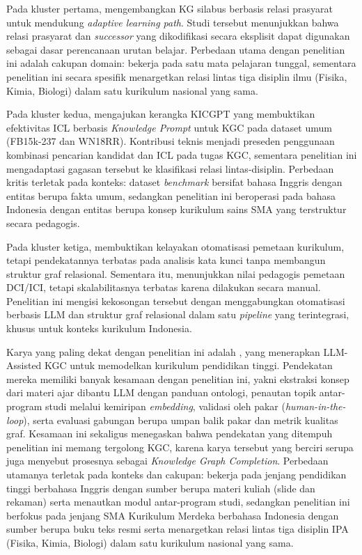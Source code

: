 \documentclass[../../thesis]{subfiles}
\begin{document}
Pada kluster pertama, \textcite{zhang_learning_2023} mengembangkan KG silabus
berbasis relasi prasyarat untuk mendukung \textit{adaptive learning
path}. Studi tersebut menunjukkan bahwa relasi prasyarat dan \textit{successor}
yang dikodifikasi secara eksplisit dapat digunakan sebagai dasar
perencanaan urutan belajar. Perbedaan utama dengan penelitian
ini adalah cakupan domain: \citeauthor{zhang_learning_2023} bekerja pada satu mata pelajaran
tunggal, sementara penelitian ini secara spesifik menargetkan relasi
lintas tiga disiplin ilmu (Fisika, Kimia, Biologi) dalam satu kurikulum
nasional yang sama.

Pada kluster kedua, \textcite{wei_kicgpt_2023} mengajukan kerangka KICGPT yang
membuktikan efektivitas ICL berbasis \textit{Knowledge Prompt} untuk KGC pada
dataset umum (FB15k-237 dan WN18RR). Kontribusi teknis \citeauthor{wei_kicgpt_2023}
menjadi preseden penggunaan kombinasi pencarian kandidat dan ICL pada tugas KGC,
sementara penelitian ini mengadaptasi gagasan tersebut ke klasifikasi relasi
lintas-disiplin. Perbedaan kritis terletak pada konteks: dataset
\textit{benchmark} \citeauthor{wei_kicgpt_2023} bersifat bahasa Inggris dengan entitas
berupa fakta umum, sedangkan penelitian ini beroperasi pada bahasa
Indonesia dengan entitas berupa konsep kurikulum sains SMA yang
terstruktur secara pedagogis.

Pada kluster ketiga, \textcite{said_mapping_2024} membuktikan kelayakan
otomatisasi pemetaan kurikulum, tetapi pendekatannya terbatas pada analisis
kata kunci tanpa membangun struktur graf relasional. Sementara itu,
\textcite{semilarski_expanding_2022} menunjukkan nilai pedagogis pemetaan
DCI/ICI, tetapi skalabilitasnya terbatas karena dilakukan secara manual.
Penelitian ini mengisi kekosongan tersebut dengan menggabungkan otomatisasi
berbasis LLM dan struktur graf relasional dalam satu \textit{pipeline} yang
terintegrasi, khusus untuk konteks kurikulum Indonesia.

Karya yang paling dekat dengan penelitian ini adalah
\textcite{abu-rasheed_llm-assisted_2025}, yang menerapkan LLM-Assisted KGC untuk
memodelkan kurikulum pendidikan tinggi. Pendekatan mereka memiliki banyak
kesamaan dengan penelitian ini, yakni ekstraksi konsep dari materi ajar dibantu
LLM dengan panduan ontologi, penautan topik antar-program studi melalui
kemiripan \textit{embedding}, validasi oleh pakar (\textit{human-in-the-loop}),
serta evaluasi gabungan berupa umpan balik pakar dan metrik kualitas graf.
Kesamaan ini sekaligus menegaskan bahwa pendekatan yang ditempuh penelitian ini
memang tergolong KGC, karena karya tersebut yang berciri serupa juga menyebut
prosesnya sebagai \textit{Knowledge Graph Completion}. Perbedaan utamanya
terletak pada konteks dan cakupan: \citeauthor{abu-rasheed_llm-assisted_2025}
bekerja pada jenjang pendidikan tinggi berbahasa Inggris dengan sumber berupa
materi kuliah (slide dan rekaman) serta menautkan modul antar-program studi,
sedangkan penelitian ini berfokus pada jenjang SMA Kurikulum Merdeka berbahasa
Indonesia dengan sumber berupa buku teks resmi serta menargetkan relasi lintas
tiga disiplin IPA (Fisika, Kimia, Biologi) dalam satu kurikulum nasional yang
sama.
\end{document}
